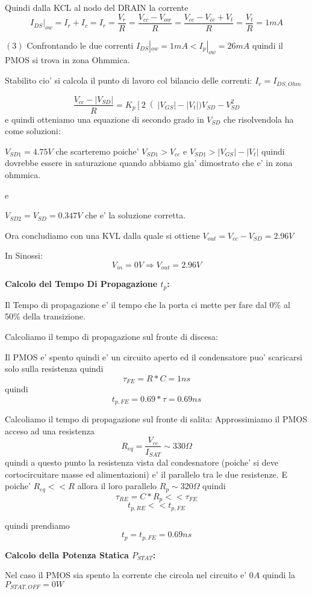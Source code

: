 \documentclass[\main/main.tex]{subfiles}
\begin{document}
Quindi dalla KCL al nodo del DRAIN la corrente \[I_{DS}|_{ow} = I_r + I_c = I_r = \frac{V_r}{R}= \frac{ V_{cc} - V_{ow}}{R} =  \frac{ V_{cc} - V_{cc} + V_t}{R} = \frac{V_t}{R} = 1mA\]

$(3)$ Confrontando le due correnti $I_{DS}|_{ow} = 1mA < I_p |_{ow} = 26mA$ quindi il PMOS si trova in zona Ohmmica.


Stabilito cio' si calcola il punto di lavoro col bilancio delle correnti:
$I_r = I_{DS,Ohm}$

\[\frac{V_{cc} - |V_{SD}|}{R} = K_p \left[ 2 \right(|V_{GS}| - |V_t|)V_{SD} - V_{SD}^2\]
e quindi otteniamo una equazione di secondo grado in $V_{SD}$ che risolvendola ha come soluzioni:

$V_{SD1} = 4.75V$ che scarteremo poiche' $V_{SD1} > V_{cc}$ e $V_{SD1} > |V_{GS}| - |V_t|$ quindi dovrebbe essere in saturazione quando abbiamo gia' dimostrato che e' in zona ohmmica.

e

$V_{SD2} = V_{SD} = 0.347V$ che e' la soluzione corretta.

Ora concludiamo con una KVL dalla quale si ottiene $V_{out} = V_{cc} - V_{SD} = 2.96V$

In Sinossi:
\[V_{in} = 0V \Rightarrow V_{out} = 2.96V\]

\clearpage
\textbf{Calcolo del Tempo Di Propagazione $t_p$:}

Il Tempo di propagazione e' il tempo che la porta ci mette per fare dal 0\% al 50\% della transizione.

Calcoliamo il tempo di propagazione sul fronte di discesa:

Il PMOS e' spento quindi e' un circuito aperto ed il condensatore puo' scaricarsi solo sulla resistenza quindi \[\tau_{FE} = R * C = 1ns\]
quindi \[t_{p,FE} = 0.69 * \tau = 0.69ns\]

Calcoliamo il tempo di propagazione sul fronte di salita:
Approssimiamo il PMOS acceso ad una resistenza
\[R_{eq} = \frac{V_{cc}}{I_{SAT}} \sim 330\Omega\]
quindi a questo punto la resistenza vista dal condesnatore (poiche' si deve cortocircuitare masse ed alimentazioni) e' il parallelo tra le due resistenze.
E poiche' $R_{eq} << R$ allora il loro parallelo $R_p \sim 320\Omega$
quindi \[\tau_{RE} = C * R_p << \tau_{FE}\]
\[t_{p,RE} << t_{p,FE}\]

quindi prendiamo \[t_p = t_{p,FE} = 0.69ns\]

\textbf{Calcolo della Potenza Statica $P_{STAT}$:}

Nel caso il PMOS sia spento la corrente che circola nel circuito e' $0A$ quindi la $P_{STAT,OFF} = 0W$
\end{document}
